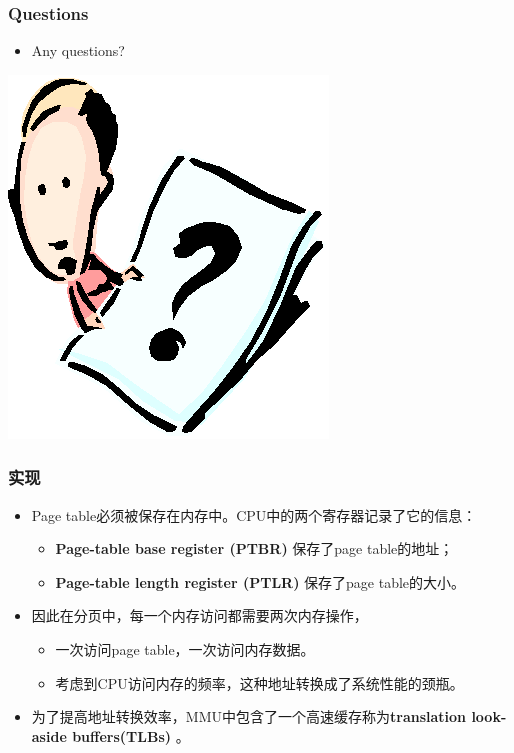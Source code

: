 \documentclass[CJKutf8,xcolor=pdftex,dvipsnames,table]{beamer}
\begin{document}
\begin{CJK*}{UTF8}{song}
  \begin{frame}
  \frametitle{Questions}
  \begin{itemize}
  \item{Any questions?}
  \end{itemize}
  \begin{center}
    \includegraphics[scale=.5]{question}
  \end{center}
  \end{frame}
  
  \begin{frame}
  \frametitle{实现} \pause
  \begin{itemize}
  \item{Page table必须被保存在内存中。CPU中的两个寄存器记录了它的信息：}  \pause
    \begin{itemize}
    \item{\textbf{Page-table base register (PTBR)} 保存了page table的地址；} \pause
    \item{\textbf{Page-table length register (PTLR)} 保存了page table的大小。} \pause
    \end{itemize}
  \item{因此在分页中，每一个内存访问都需要两次内存操作，} \pause
    \begin{itemize}
    \item{一次访问page table，一次访问内存数据。} \pause
    \item{考虑到CPU访问内存的频率，这种地址转换成了系统性能的颈瓶。} \pause
    \end{itemize}
  \item{为了提高地址转换效率，MMU中包含了一个高速缓存称为\textbf{translation look-aside buffers(TLBs)} 。}
  \end{itemize}
  \end{frame}


\end{CJK*}
\end{document}
